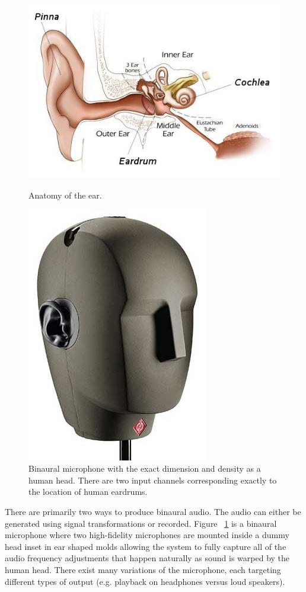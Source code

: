 \begin{figure}[htbp3]
  \begin{minipage}[b]{.45\linewidth}
    \centering
    \includegraphics[width=1\textwidth]{images/ear_diagram.jpg}
    \caption{Anatomy of the ear.}
    \label{fig:ear_diagram}
  \end{minipage}
  \hspace{0.5cm}
  \begin{minipage}[b]{0.5\linewidth}
    \centering
    \includegraphics[width=.4\textwidth]{images/binaural_mic.jpg}
    \caption{Binaural microphone with the exact dimension and density as a human
     head. There are two input channels corresponding exactly to the location of
     human eardrums.}
    \label{fig:binaural_mic}
  \end{minipage}
\end{figure}

There are primarily two ways to produce binaural audio.  The audio can either be
generated using signal transformations or recorded.  Figure
~\ref{fig:binaural_mic} is a binaural microphone where two high-fidelity
microphones are mounted inside a dummy head inset in ear shaped molds allowing
the system to fully capture all of the audio frequency adjustments that happen
naturally as sound is warped by the human head. There exist many variations of
the microphone, each targeting different types of output (e.g. playback on
headphones versus loud speakers).


